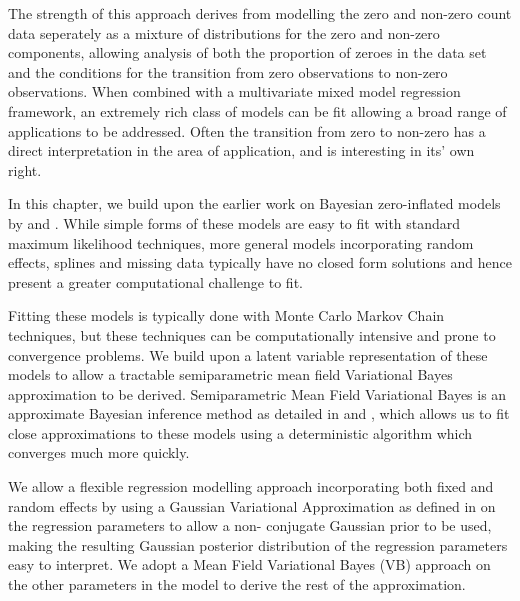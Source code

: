 \documentclass{amsart}[12pt]
\begin{document}
The strength of this approach derives from modelling the zero and non-zero count data seperately as a mixture
of distributions for the zero and non-zero components, allowing analysis of both the proportion of zeroes in
the data set and the conditions for the transition from zero observations to non-zero observations. When
combined with a multivariate mixed model regression framework, an extremely rich class of models can be fit
allowing a broad range of applications to be addressed. Often the transition from zero to non-zero has a
direct interpretation in the area of application, and is interesting in its' own right.

In this chapter, we build upon the earlier work on Bayesian zero-inflated models by \citep{Ghosh2006} and
\citep{Vatsa2014}. While simple forms of these models are easy to fit with standard maximum likelihood
techniques, more general models incorporating random effects, splines and missing data typically have no
closed form solutions and hence present a greater computational challenge to fit.

Fitting these models is typically done with Monte Carlo Markov Chain techniques, but these techniques can be
computationally intensive and prone to convergence problems. We build upon a latent variable representation of
these models to allow a tractable semiparametric mean field Variational Bayes approximation to be derived.
Semiparametric Mean Field  Variational Bayes is an approximate Bayesian inference method as detailed in
\citep{Ormerod2010} and \citep{Rohde2015}, which allows us to fit close approximations to these models using a
deterministic  algorithm which converges much more quickly.

We allow a flexible regression modelling approach incorporating both fixed and random effects by using a
Gaussian Variational Approximation as defined in \citep{Ormerod2012} on the regression parameters to allow a
non- conjugate Gaussian prior to be used, making the resulting Gaussian posterior distribution of the
regression parameters easy to interpret. We adopt a Mean Field  Variational Bayes (VB) approach on the other
parameters in the model to derive the rest of the approximation.
\end{document}
